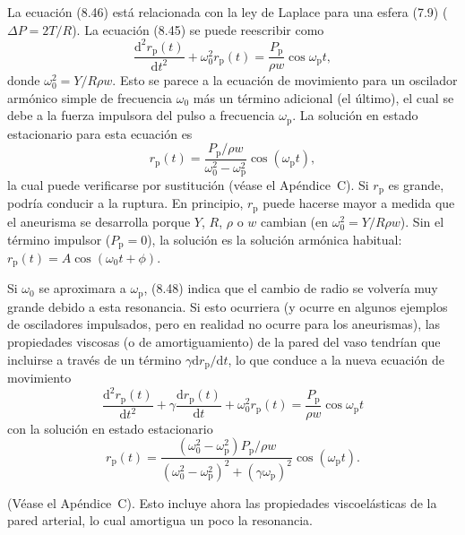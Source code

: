 \documentclass[12pt]{book}
\begin{document}
La ecuación (8.46) está relacionada con la ley de Laplace para una esfera (7.9) ($\Delta P = 2T/R$). La ecuación (8.45) se puede reescribir como
\begin{equation}
\frac{\mathrm{d}^2 r_{\text{p}}(t)}{\mathrm{d}t^2} + \omega_0^2 r_{\text{p}}(t) = \frac{P_{\text{p}}}{\rho w} \cos\omega_{\text{p}} t,
\label{eq:847}
\end{equation}
donde $\omega_0^2 = Y/R\rho w$. Esto se parece a la ecuación de movimiento para un oscilador armónico simple de frecuencia $\omega_0$ más un término adicional (el último), el cual se debe a la fuerza impulsora del pulso a frecuencia $\omega_{\text{p}}$. La solución en estado estacionario para esta ecuación es
\begin{equation}
r_{\text{p}}(t) = \frac{P_{\text{p}} / \rho w}{\omega_0^2 - \omega_{\text{p}}^2} \cos(\omega_{\text{p}} t),
\label{eq:848}
\end{equation}
la cual puede verificarse por sustitución (véase el Apéndice~C). Si $r_{\text{p}}$ es grande, podría conducir a la ruptura. En principio, $r_{\text{p}}$ puede hacerse mayor a medida que el aneurisma se desarrolla porque $Y$, $R$, $\rho$ o $w$ cambian (en $\omega_0^2 = Y/R\rho w$). Sin el término impulsor ($P_{\text{p}} = 0$), la solución es la solución armónica habitual: $r_{\text{p}}(t) = A \cos(\omega_0 t + \phi)$.

Si $\omega_0$ se aproximara a $\omega_{\text{p}}$, (8.48) indica que el cambio de radio se volvería muy grande debido a esta resonancia. Si esto ocurriera (y ocurre en algunos ejemplos de osciladores impulsados, pero en realidad no ocurre para los aneurismas), las propiedades viscosas (o de amortiguamiento) de la pared del vaso tendrían que incluirse a través de un término $\gamma \mathrm{d}r_{\text{p}}/\mathrm{d}t$, lo que conduce a la nueva ecuación de movimiento
\begin{equation}
\frac{\mathrm{d}^2 r_{\text{p}}(t)}{\mathrm{d}t^2} + \gamma \frac{\mathrm{d} r_{\text{p}}(t)}{\mathrm{d}t} + \omega_0^2 r_{\text{p}}(t) = \frac{P_{\text{p}}}{\rho w} \cos\omega_{\text{p}} t
\label{eq:849}
\end{equation}
con la solución en estado estacionario
\begin{equation}
r_{\text{p}}(t) = \frac{(\omega_0^2 - \omega_{\text{p}}^2) P_{\text{p}}/\rho w}{(\omega_0^2 - \omega_{\text{p}}^2)^2 + (\gamma \omega_{\text{p}})^2} \cos(\omega_{\text{p}} t).
\label{eq:850}
\end{equation}

(Véase el Apéndice~C). Esto incluye ahora las propiedades viscoelásticas de la pared arterial, lo cual amortigua un poco la resonancia.
\end{document}
